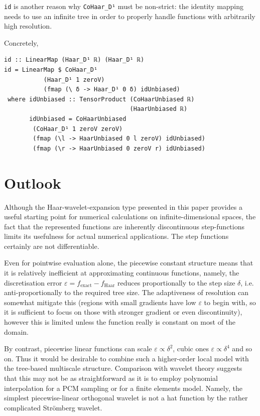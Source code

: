 \documentclass[sigplan,screen]{acmart}
\theoremstyle{acmplain}
\theoremstyle{acmdefinition}
\begin{document}
\verb`id` is another reason why \lstinline`CoHaar_D¹` must be non-strict: the identity mapping needs to use an infinite tree in order to properly handle functions with arbitrarily high resolution.

Concretely,
\begin{lstlisting}[xleftmargin=1.5em]
id :: LinearMap (Haar_D¹ ℝ) (Haar_D¹ ℝ)
id = LinearMap $ CoHaar_D¹
           (Haar_D¹ 1 zeroV)
           (fmap (\ δ -> Haar_D¹ 0 δ) idUnbiased)
 where idUnbiased :: TensorProduct (CoHaarUnbiased ℝ)
                                   (HaarUnbiased ℝ)
       idUnbiased = CoHaarUnbiased
        (CoHaar_D¹ 1 zeroV zeroV)
        (fmap (\l -> HaarUnbiased 0 l zeroV) idUnbiased)
        (fmap (\r -> HaarUnbiased 0 zeroV r) idUnbiased)
\end{lstlisting}

\section{Outlook}
Although the Haar-wavelet-expansion type presented in this paper provides a useful starting point for numerical calculations on infinite-dimensional spaces, the fact that the represented functions are inherently discontinuous step-functions limits its usefulness for actual numerical applications. The step functions certainly are not differentiable.

Even for pointwise evaluation alone, the piecewise constant structure means that it is relatively inefficient at approximating continuous functions, namely, the discretisation error $\varepsilon = f_\text{exact} - f_\text{Haar}$ reduces proportionally to the step size $\delta$, i.e. anti-proportionally to the required tree size.
The adaptiveness of resolution can somewhat mitigate this (regions with small gradients have low $\varepsilon$ to begin with, so it is sufficient to focus on those with stronger gradient or even discontinuity), however this is limited unless the function really is constant on most of the domain.

By contrast, piecewise linear functions can scale $\varepsilon \propto \delta^2$, cubic ones $\varepsilon \propto \delta^4$ and so on. Thus it would be desirable to combine such a higher-order local model with the tree-based multiscale structure.
Comparison with wavelet theory suggests that this may not be as straightforward as it is to employ polynomial interpolation for a PCM sampling or for a finite elements model. Namely, the simplest piecewise-linear orthogonal wavelet is not a hat function by the rather complicated Strömberg wavelet.
\balance
\end{document}
